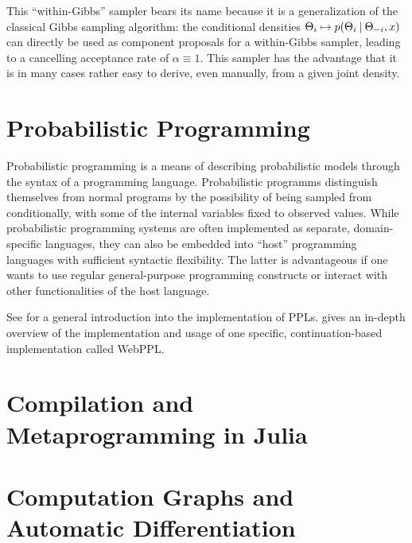 This \enquote{within-Gibbs} sampler bears its name because it is a generalization of the classical
Gibbs sampling algorithm: the conditional densities
\(\Theta_{i} \mapsto p(\Theta_{i} \:\vert\: \Theta_{-i}, x)\) can directly be used as component
proposals for a within-Gibbs sampler, leading to a cancelling acceptance rate of
\(\alpha \equiv 1\).  This sampler has the advantage that it is in many cases rather easy to derive,
even manually, from a given joint density.


\section{Probabilistic Programming}
\label{sec:prob-prog}

Probabilistic programming is a means of describing probabilistic models through the syntax of a
programming language. Probabilistic programms distinguish themselves from normal programs by the
possibility of being sampled from conditionally, with some of the internal variables fixed to
observed values.  While probabilistic programming systems are often implemented as separate,
domain-specific languages, they can also be embedded into \enquote{host} programming languages with
sufficient syntactic flexibility.  The latter is advantageous if one wants to use regular
general-purpose programming constructs or interact with other functionalities of the host language.

See \textcite{vandemeent2018introduction} for a general introduction into the implementation of
PPLs. \Textcite{goodman2014design} gives an in-depth overview of the implementation and usage of one
specific, continuation-based implementation called WebPPL.

\section{Compilation and Metaprogramming in Julia}
\label{sec:comp-metapr-julia}

\textcite{singer2018introduction}


\section{Computation Graphs and Automatic Differentiation}
\label{sec:graph-track-autom}




